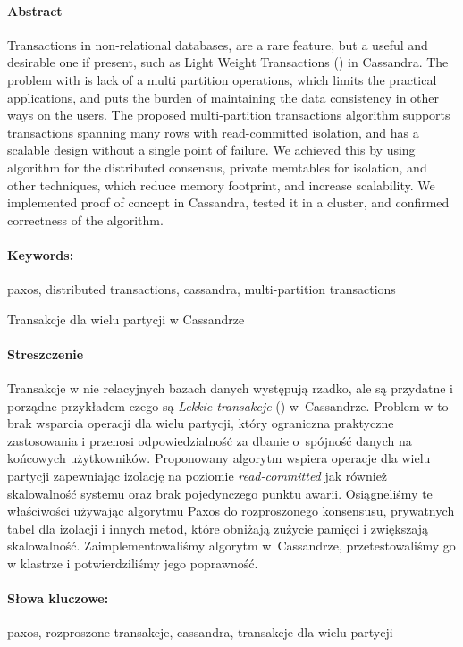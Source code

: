 \newpage
\paragraph{Abstract} 
Transactions in non-relational databases, are a rare feature, but a useful and desirable one if present, such as Light Weight Transactions (\lwt) in Cassandra.
The problem with \lwt is lack of a multi partition operations, which limits the practical applications, and puts the burden of maintaining the data consistency in other ways on the users.
The proposed multi-partition transactions algorithm supports transactions spanning many rows with read-committed isolation, and has a scalable design without a single point of failure.
We achieved this by using \paxos algorithm for the distributed consensus, private memtables for isolation, and other techniques, which reduce memory footprint, and increase scalability.
We implemented proof of concept in Cassandra, tested it in a cluster, and confirmed correctness of the algorithm.

\paragraph{Keywords:} paxos, distributed transactions, cassandra, multi-partition transactions

\begin{center}
    \fontsize{12pt}{14pt}\selectfont
      Transakcje dla wielu partycji w Cassandrze  \\
\end{center}
\paragraph{Streszczenie} 
Transakcje w nie relacyjnych bazach danych występują rzadko, ale są przydatne i porządne przykładem czego są \emph{Lekkie transakcje} (\lwt) \mbox{w Cassandrze.}
Problem w \lwt to brak wsparcia operacji dla wielu partycji, który ograniczna praktyczne zastosowania i przenosi odpowiedzialność za dbanie \mbox{o spójność} danych na końcowych użytkowników.
Proponowany algorytm wspiera operacje dla wielu partycji zapewniając izolację na poziomie \emph{read-committed} jak również skalowalność systemu oraz brak pojedynczego punktu awarii.
Osiągneliśmy te właściwości używając algorytmu Paxos do rozproszonego konsensusu, prywatnych tabel dla izolacji i innych metod, które obniżają zużycie pamięci i zwiększają skalowalność.
Zaimplementowaliśmy algorytm \mbox{w Cassandrze}, przetestowaliśmy go w klastrze i potwierdziliśmy jego poprawność.

\paragraph{Słowa kluczowe:} paxos, rozproszone transakcje, cassandra, transakcje dla wielu partycji

